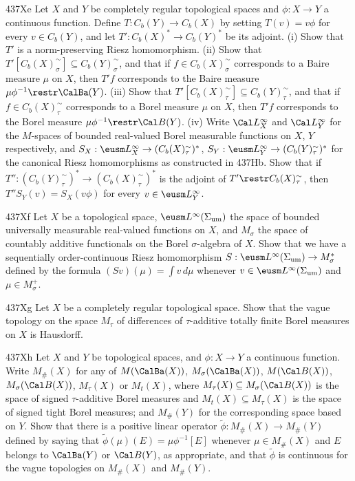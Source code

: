 {\spheader 437Xe Let $X$ and $Y$ be completely regular
topological spaces and $\phi:X\to Y$
a continuous function.   Define $T:C_b(Y)\to C_b(X)$ by setting
$T(v)=v\phi$ for every $v\in C_b(Y)$, and let $T':C_b(X)^*\to C_b(Y)^*$
be its adjoint.   (i) Show that $T'$ is a norm-preserving Riesz
homomorphism.   (ii) Show that
$T'[C_b(X)^{\sim}_{\sigma}]\subseteq C_b(Y)^{\sim}_{\sigma}$, and that
if $f\in C_b(X)^{\sim}_{\sigma}$ corresponds to a Baire measure $\mu$ on
$X$, then $T'f$ corresponds to the Baire measure
$\mu\phi^{-1}\restr\CalBa(Y)$.   (iii) Show that
$T'[C_b(X)^{\sim}_{\tau}]\subseteq C_b(Y)^{\sim}_{\tau}$, and that if
$f\in C_b(X)^{\sim}_{\tau}$ corresponds to a Borel measure $\mu$ on $X$,
then $T'f$ corresponds to the Borel measure
$\mu\phi^{-1}\restr\Cal B(Y)$.   (iv) Write $\Cal L^{\infty}_X$ and
$\Cal L^{\infty}_Y$ for the
$M$-spaces of bounded real-valued Borel measurable functions on $X$, $Y$
respectively, and $S_X:\eusm L^{\infty}_X\to(C_b(X)^{\sim}_{\tau})^*$,
$S_Y:\eusm L^{\infty}_Y\to(C_b(Y)^{\sim}_{\tau})^*$ for the canonical
Riesz homomorphisms as constructed in 437Hb.   Show that if
$T'':(C_b(Y)^{\sim}_{\tau})^*\to(C_b(X)^{\sim}_{\tau})^*$ is the adjoint
of $T'\restr C_b(X)^{\sim}_{\tau}$, then $T''S_Y(v)=S_X(v\phi)$ for
every $v\in\eusm L^{\infty}_Y$.

\spheader 437Xf Let $X$ be a topological space,
$\eusm L^{\infty}(\Sigma_{\text{um}})$ the
space of bounded universally measurable real-valued functions on $X$,
and $M_{\sigma}$ the space of countably additive functionals on the
Borel $\sigma$-algebra of $X$.
Show that we have a sequentially order-continuous
Riesz homomorphism
$S:\eusm L^{\infty}(\Sigma_{\text{um}})\to M_{\sigma}^*$ defined by the
formula $(Sv)(\mu)=\int v\,d\mu$ whenever
$v\in\eusm L^{\infty}(\Sigma_{\text{um}})$ and $\mu\in M_{\sigma}^+$.

\spheader 437Xg Let $X$ be a completely regular topological space.
Show that the vague topology on the space $M_{\tau}$ of differences of
$\tau$-additive totally finite Borel measures on $X$ is Hausdorff.

\sqheader 437Xh Let $X$ and $Y$ be topological spaces, and $\phi:X\to Y$
a continuous function.   Write $M_{\#}(X)$ for any of
$M(\CalBa(X))$, $M_{\sigma}(\CalBa(X))$, $M(\Cal B(X))$,
$M_{\sigma}(\Cal B(X))$, $M_{\tau}(X)$ or $M_t(X)$, where
$M_{\tau}(X)\subseteq M_{\sigma}(\Cal B(X))$
is the space of signed $\tau$-additive Borel measures and
$M_t(X)\subseteq M_{\tau}(X)$ is the space of signed tight
Borel measures;  and $M_{\#}(Y)$ for the corresponding space based on
$Y$.   Show that there is a positive linear operator
$\tilde\phi:M_{\#}(X)\to M_{\#}(Y)$ defined by saying that
$\tilde\phi(\mu)(E)=\mu\phi^{-1}[E]$ whenever $\mu\in M_{\#}(X)$
and $E$ belongs to $\CalBa(Y)$ or $\Cal B(Y)$, as appropriate, and that
$\tilde\phi$ is continuous for the vague topologies on $M_{\#}(X)$ and
$M_{\#}(Y)$.

}
